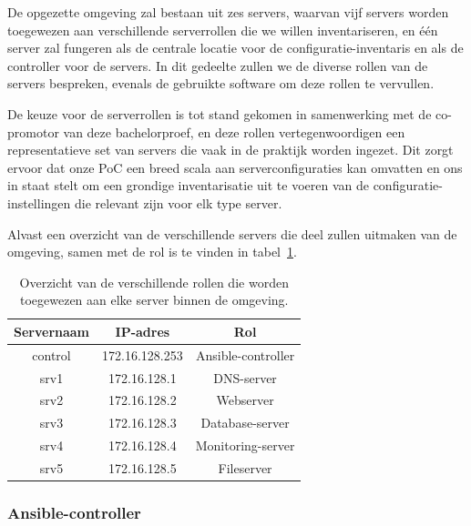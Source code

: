 De opgezette omgeving zal bestaan uit zes servers, waarvan vijf servers worden toegewezen aan verschillende serverrollen die we willen inventariseren, en één server zal fungeren als de centrale locatie voor de configuratie-inventaris en als de controller voor de servers.
In dit gedeelte zullen we de diverse rollen van de servers bespreken, evenals de gebruikte software om deze rollen te vervullen.

De keuze voor de serverrollen is tot stand gekomen in samenwerking met de co-promotor van deze bachelorproef, en deze rollen vertegenwoordigen een representatieve set van servers die vaak in de praktijk worden ingezet.
Dit zorgt ervoor dat onze PoC een breed scala aan serverconfiguraties kan omvatten en ons in staat stelt om een grondige inventarisatie uit te voeren van de configuratie-instellingen die relevant zijn voor elk type server.

Alvast een overzicht van de verschillende servers die deel zullen uitmaken van de omgeving, samen met de rol is te vinden in tabel~\ref{table:poc-server-roles}.

\begin{table}[!h]
    \begin{center}
        \begin{tabular}{ c c c }
            \hline
                Servernaam & IP-adres & Rol \\ [0.5ex]
            \hline
            control & 172.16.128.253 & Ansible-controller \\
            srv1    & 172.16.128.1   & DNS-server \\
            srv2    & 172.16.128.2   & Webserver \\
            srv3    & 172.16.128.3   & Database-server \\
            srv4    & 172.16.128.4   & Monitoring-server \\
            srv5    & 172.16.128.5   & Fileserver \\
        \end{tabular}
    \end{center}
    \caption[Rollen toegewezen aan servers.]{Overzicht van de verschillende rollen die worden toegewezen aan elke server binnen de omgeving.}
    \label{table:poc-server-roles}
\end{table}


\subsubsection{Ansible-controller}
\label{poc_ansible_controller}

